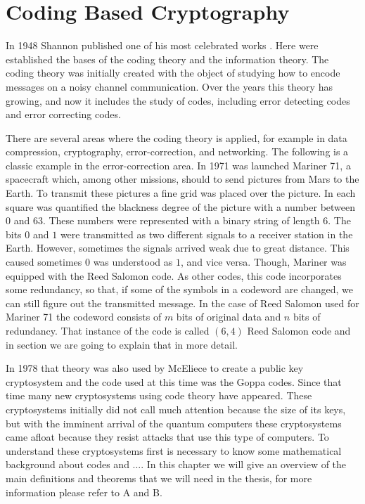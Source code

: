 \chapter{{Coding Based Cryptography}}
In 1948 Shannon published one of his most celebrated works . Here were established the bases of the coding theory and the information theory. The coding theory was initially created with the object of studying how to encode messages on a noisy channel communication. Over the years this theory has growing, and now it includes the study of codes, including error detecting codes and error correcting codes. 

There are several areas where the coding theory is applied, for example in data compression, cryptography, error-correction, and networking. The following is a classic example in the error-correction area. In 1971 was launched Mariner 71, a spacecraft which, among other missions, should to send pictures from Mars to the Earth. To transmit these pictures a fine grid was placed over the picture. In each square was quantified the blackness degree of the picture with a number between $0$ and $63$. These numbers were represented with a binary string of length $6$. The bits $0$ and $1$ were transmitted as two different signals to a receiver station in the Earth. However, sometimes the signals arrived weak due to great distance. This caused sometimes $0$ was understood as $1$, and vice versa. Though, Mariner was equipped with the Reed Salomon code. As other codes, this  code  incorporates some redundancy, so that, if some of the symbols in a codeword are changed, we can still figure out the transmitted message. In the case of Reed Salomon used for Mariner 71 the codeword consists of $m$ bits of original data and $n$ bits of redundancy. That instance of the code is called $(6,4)$ Reed Salomon code and in section we are going to explain that in more detail.

In 1978 that theory was also used by McEliece to create a public key cryptosystem and the code used at this time was the Goppa codes. Since that time many new cryptosystems using code theory have appeared. These cryptosystems initially did not call much attention because the size of its keys, but with the imminent arrival of the quantum computers these cryptosystems came afloat because they resist attacks that use this type of computers. To understand these cryptosystems first is necessary to know some mathematical background about codes and .... In this chapter we will give an overview of the main definitions and theorems that we will need in the thesis, for more information please refer to A and B.

